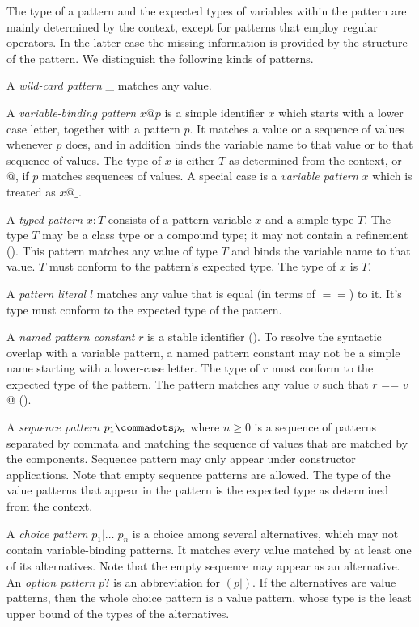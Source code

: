 \documentclass[11pt]{report}
\begin{document}
The type of a pattern and the expected types of variables within the
pattern are mainly determined by the context, except for patterns
that employ regular operators. In the latter case  the missing 
information is provided by the structure of the pattern. 
We distinguish the following kinds of patterns.

A {\em wild-card pattern} \_ matches any value. 

A {\em variable-binding pattern} $x @ p$ is a simple identifier $x$
which starts with a lower case letter, together with a pattern $p$. It
matches a value or a sequence of values whenever $p$ does, and in
addition binds the variable name to that value or to that sequence of
values. The type of $x$ is either $T$ as determined from the context, or
\verb@List[T]@, if $p$ matches sequences of values. A
special case is a {\em variable pattern} $x$ which is treated as $x @ \_$. 

A {\em typed pattern} $x: T$ consists of a pattern variable $x$ and a
simple type $T$. The type $T$ may be a class type or a compound type;
it may not contain a refinement ().  This
pattern matches any value of type $T$ and binds the variable name to
that value.  $T$ must conform to the pattern's expected type. The
type of $x$ is $T$.

A {\em pattern literal} $l$ matches any value that is equal (in terms
of $==$) to it. It's type must conform to the expected type of the
pattern.

A {\em named pattern constant} $r$ is a stable identifier
(). To resolve the syntactic overlap with a
variable pattern, a named pattern constant may not be a simple name
starting with a lower-case letter. The type of $r$ must conform
to the expected type of the pattern. The pattern matches any value $v$
such that \verb@$r$ == $v$@ ().

A {\em sequence pattern} $p_1 \commadots p_n$ where $n \geq 0$ is a
sequence of patterns separated by commata and matching the sequence of
values that are matched by the components. Sequence pattern may only
appear under constructor applications. Note that empty sequence
patterns are allowed. The type of the value patterns that appear in
the pattern is the expected type as determined from the context.

A {\em choice pattern} $p_1 | \ldots | p_n$ is a choice among several
alternatives, which may not contain variable-binding patterns. It
matches every value matched by at least one of its alternatives. Note
that the empty sequence may appear as an alternative.  An {\em option
pattern} $p?$ is an abbreviation for $(p| )$. If the alternatives
are value patterns, then the whole choice pattern is a value pattern,
whose type is the least upper bound of the types of the alternatives.
\end{document}
